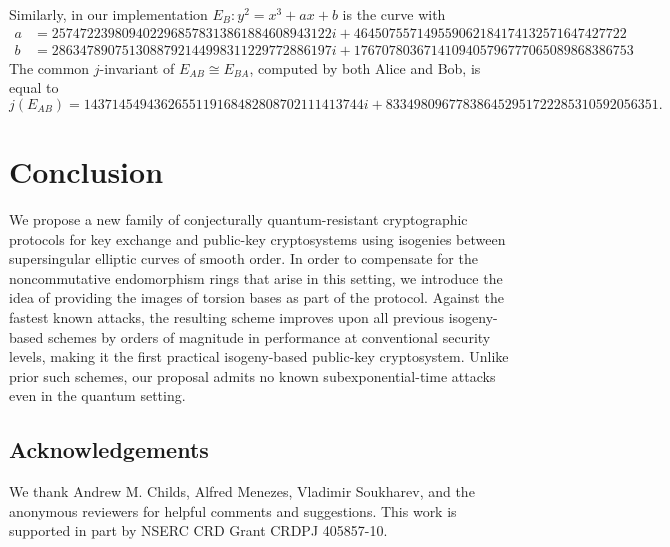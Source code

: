 \documentclass[envcountsect,envcountsame,runningheads]{llncs}   %
\newcommand{\iso}{\cong}
\begin{document}
Similarly, in our implementation $E_B : y^2 = x^3 + ax
+ b$ is the curve with
{\tiny
\begin{align*}
a &= 2574722398094022968578313861884608943122 i + 464507557149559062184174132571647427722 \\
b &= 2863478907513088792144998311229772886197 i + 1767078036714109405796777065089868386753
\end{align*}
}
The common $j$-invariant of $E_{AB} \iso E_{BA}$, computed by both
Alice and Bob, is equal to
{\tiny
\[
j(E_{AB}) = 1437145494362655119168482808702111413744 i +
833498096778386452951722285310592056351.\]
}
\vspace{-2em}

\section{Conclusion}

We propose a new family of conjecturally quantum-resistant cryptographic
protocols for key exchange and public-key cryptosystems using isogenies
between supersingular elliptic curves of smooth order. In order to
compensate for the noncommutative endomorphism rings that arise in this
setting, we introduce the idea of providing the images of torsion bases
as part of the protocol. Against the fastest known attacks, the
resulting scheme improves upon all previous isogeny-based schemes by
orders of magnitude in performance at conventional security levels,
making it the first practical isogeny-based public-key cryptosystem.
Unlike prior such schemes, our proposal admits no known
subexponential-time attacks even in the quantum setting.

\subsection*{Acknowledgements}

We thank Andrew M. Childs, Alfred Menezes, Vladimir Soukharev, and
the anonymous reviewers for helpful comments and suggestions. This work
is supported in part by NSERC CRD Grant CRDPJ 405857-10.



\end{document}

